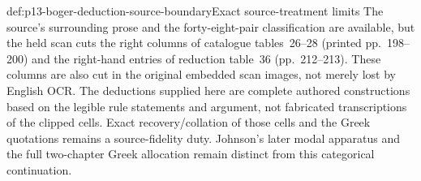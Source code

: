 \begin{proofboundary}{def:p13-boger-deduction-source-boundary}{Exact source-treatment limits}
The source's surrounding prose and the forty-eight-pair classification are
available, but the held scan cuts the right columns of catalogue tables~26--28
(printed pp.~198--200) and the right-hand entries of reduction table~36
(pp.~212--213). These columns are also cut in the original embedded scan images,
not merely lost by English OCR. The deductions supplied here are complete
authored constructions based on the legible rule statements and argument,
not fabricated transcriptions of the clipped cells. Exact recovery/collation
of those cells and the Greek quotations remains a source-fidelity duty.
Johnson's later modal apparatus and the full two-chapter Greek allocation
remain distinct from this categorical continuation.
\end{proofboundary}
